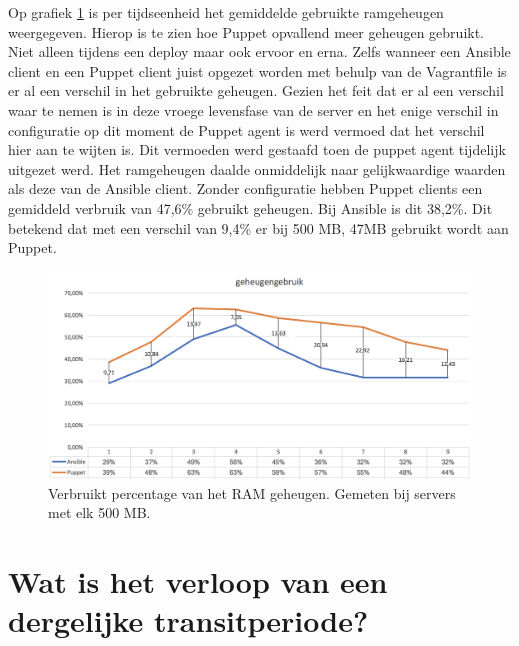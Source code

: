 Op grafiek \ref{fig:geheugengebruik} is per tijdseenheid het gemiddelde gebruikte ramgeheugen weergegeven. Hierop is te zien hoe Puppet opvallend meer geheugen gebruikt. Niet alleen tijdens een deploy maar ook ervoor en erna. Zelfs wanneer een Ansible client en een Puppet client juist opgezet worden met behulp van de Vagrantfile is er al een verschil in het gebruikte geheugen. Gezien het feit dat er al een verschil waar te nemen is in deze vroege levensfase van de server en het enige verschil in configuratie op dit moment de Puppet agent is werd vermoed dat het verschil hier aan te wijten is. Dit vermoeden werd gestaafd toen de puppet agent tijdelijk uitgezet werd. Het ramgeheugen daalde onmiddelijk naar gelijkwaardige waarden als deze van de Ansible client. Zonder configuratie hebben Puppet clients een gemiddeld verbruik van 47,6\% gebruikt geheugen. Bij Ansible is dit 38,2\%. Dit betekend dat met een verschil van 9,4\% er bij 500 MB, 47MB gebruikt wordt aan Puppet.


\begin{figure}
  \includegraphics[width=\linewidth]{img/geheugengebruik}
 \caption{Verbruikt percentage van het RAM geheugen. Gemeten bij servers met elk 500 MB. }  
  \label{fig:geheugengebruik}
\end{figure}



\section{Wat is het verloop van een dergelijke transitperiode?}
\label{sec:methodologie-verloop-transit}









